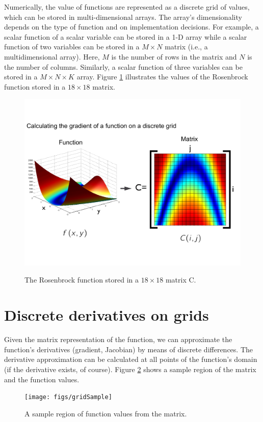 \documentclass[12pt,letter]{article}
\begin{document}
Numerically, the value of functions are represented as a discrete grid of values, which can be  stored in multi-dimensional arrays. The array's dimensionality depends on the type of function and on implementation decisions. For example, a scalar function of a scalar variable can be stored in a 1-D array while a scalar function of two variables can be stored in a $M\times N$ matrix (i.e., a multidimensional array). Here, $M$ is the number of rows in the matrix and $N$ is the number of columns. Similarly, a scalar function of three variables can be stored in a $M\times N \times K$ array. Figure \ref{fig_matrixFunction} illustrates the values of the Rosenbrock function stored in a $18\times 18$ matrix. 
\begin{figure}[H]
	\begin{center}
		{\includegraphics[width=.99\textwidth]{figs/matrixFunction}}
	\end{center}
	\caption{The Rosenbrock function stored in a $18 \times 18 $ matrix C.}
	\label{fig_matrixFunction}
\end{figure}

\section{Discrete derivatives on grids}

Given the matrix representation of the function, we can approximate the function's derivatives (gradient, Jacobian) by means of discrete differences.
The derivative approximation can be calculated at all points of the function's domain (if the derivative exists, of course). Figure \ref{fig_matrixFunctionSample} shows a sample region of the matrix and the function values. 
\begin{figure}[H]
	\begin{center}
		{\texttt{[image: figs/gridSample]}}
	\end{center}
	\caption{A sample region of function values from the matrix.}
	\label{fig_matrixFunctionSample}
\end{figure}
\end{document}
